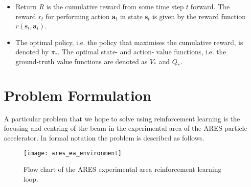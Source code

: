 \begin{itemize}
    \item Return $R$ is the cumulative reward from some time step $t$ forward. The reward $r_t$ for performing action $\bm{a}_t$ in state $\bm{s}_t$ is given by the reward function $r(\bm{s}_t, \bm{a}_t)$.
    \item The optimal policy, i.e. the policy that maximises the cumulative reward, is denoted by $\pi_*$. The optimal state- and action- value functions, i.e. the ground-truth value functions are denoted as $V_*$ and $Q_*$.
\end{itemize}

\section{Problem Formulation}

A particular problem that we hope to solve using reinforcement learning is the focusing and centring of the beam in the experimental area of the ARES particle accelerator. In formal notation the problem is described as follows.

\begin{figure}
    \centering
    \texttt{[image: ares\_ea\_environment]}
    \caption{Flow chart of the ARES experimental area reinforcement learning loop.}
    \label{fig:ares_ea_environment}
\end{figure}

